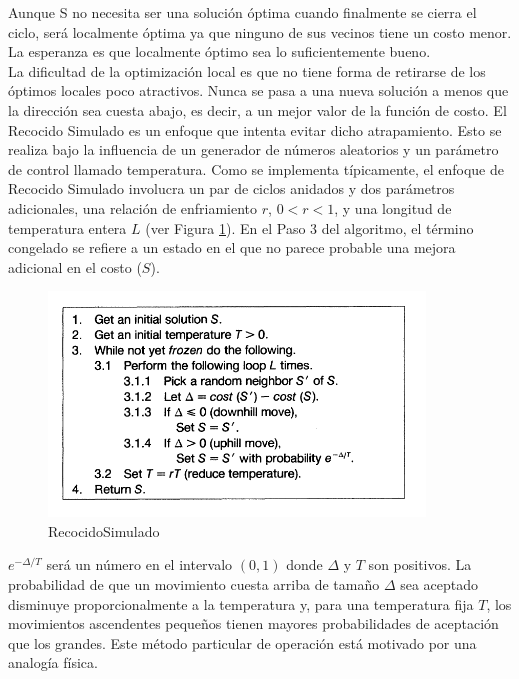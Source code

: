 \documentclass[a4paper,12pt]{book}
\begin{document}
		Aunque S no necesita ser una solución óptima cuando finalmente se cierra el ciclo, será localmente óptima ya que ninguno de sus vecinos tiene un costo menor. La esperanza es que localmente óptimo sea lo suficientemente bueno. \\
		
		La dificultad de la optimización local es que no tiene forma de retirarse de los óptimos locales poco atractivos. Nunca se pasa a una nueva solución a menos que la dirección sea cuesta abajo, es decir, a un mejor valor de la función de costo. El Recocido Simulado es un enfoque que intenta evitar dicho atrapamiento. Esto se realiza bajo la influencia de un generador de números aleatorios y un parámetro de control llamado temperatura. Como se implementa típicamente, el enfoque de Recocido Simulado involucra un par de ciclos anidados y dos parámetros adicionales, una relación de enfriamiento $r$, $0 < r <1$, y una longitud de temperatura entera $L$ (ver Figura \ref{RecocidoSimulado}). En el Paso 3 del algoritmo, el término congelado se refiere a un estado en el que no parece probable una mejora adicional en el costo ($S$).
		
		\begin{figure}[h]
		\centering
		\includegraphics[width=10cm]{./Graphics/RecocidoSimulado.png}
		\caption{RecocidoSimulado}
		\label{RecocidoSimulado}
		\end{figure}
		
		$e ^{-\Delta / T}$ será un número en el intervalo $(0, 1)$ donde $\Delta$ y $T$ son positivos. La probabilidad de que un movimiento cuesta arriba de tamaño $\Delta$ sea aceptado disminuye proporcionalmente a la temperatura y, para una temperatura fija $T$, los movimientos ascendentes pequeños tienen mayores probabilidades de aceptación que los grandes. Este método particular de operación está motivado por una analogía física.
		
\end{document}
